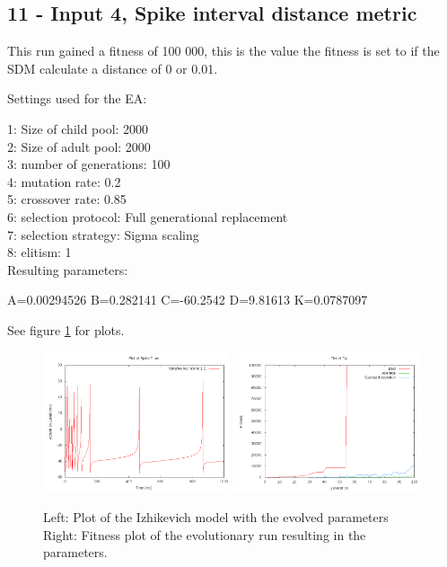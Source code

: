 \documentclass[11pt]{article}
\begin{document}
\subsection*{11 - Input 4, Spike interval distance metric}

This run gained a fitness of 100 000, this is the value the fitness is set to
if the SDM calculate a distance of 0 or 0.01.

Settings used for the EA:

1: Size of child pool: 2000\\
2: Size of adult pool: 2000\\
3: number of generations: 100\\
4: mutation rate: 0.2\\
5: crossover rate: 0.85\\
6: selection protocol: Full generational replacement\\
7: selection strategy: Sigma scaling\\
8: elitism: 1\\

Resulting parameters:

A=0.00294526 B=0.282141 C=-60.2542 D=9.81613 K=0.0787097

See figure \ref{fig:11} for plots.

\begin{figure}
\begin{center}
\mbox{\includegraphics[width=0.49\textwidth]{images/11-res.png}}
\mbox{\includegraphics[width=0.49\textwidth]{images/11-fit.png}}
\end{center}
\caption{Left: Plot of the Izhikevich model with the evolved parameters\\
Right: Fitness plot of the evolutionary run resulting in the parameters.}
\label{fig:11}
\end{figure}
\end{document}
